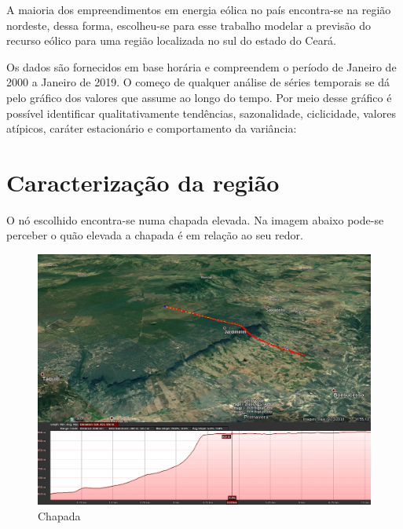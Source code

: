 \documentclass[
	12pt,				%
	openright,			%
	oneside,			%
	a4paper,			%
	english,			%
	french,				%
	spanish,			%
	brazil				%
	]{abntex2}
\begin{document}

A maioria dos empreendimentos em energia eólica no país encontra-se na região nordeste, dessa forma, escolheu-se para esse trabalho modelar a previsão do recurso eólico para uma região localizada no sul do estado do Ceará.

Os dados são fornecidos em base horária e compreendem o período de Janeiro de 2000 a Janeiro de 2019. O começo de qualquer análise de séries temporais se dá pelo gráfico dos valores que assume ao longo do tempo. Por meio desse gráfico é possível identificar qualitativamente tendências, sazonalidade, ciclicidade, valores atípicos, caráter estacionário e comportamento da variância:


\chapter{Caracterização da região}

O nó escolhido encontra-se numa chapada elevada. Na imagem abaixo pode-se perceber o quão elevada a chapada é em relação ao seu redor.

\begin{figure}[h]
    \centering
	\includegraphics[width=\textwidth]{elevation}
	\caption{Chapada}
\end{figure}
\FloatBarrier
\end{document}
